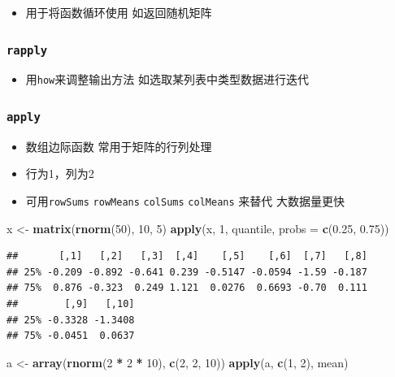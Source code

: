 \documentclass[
]{book}
\newenvironment{Shaded}{\begin{snugshade}}{\end{snugshade}}
\newcommand{\DataTypeTok}[1]{\textcolor[rgb]{0.13,0.29,0.53}{#1}}
\newcommand{\DecValTok}[1]{\textcolor[rgb]{0.00,0.00,0.81}{#1}}
\newcommand{\FloatTok}[1]{\textcolor[rgb]{0.00,0.00,0.81}{#1}}
\newcommand{\KeywordTok}[1]{\textcolor[rgb]{0.13,0.29,0.53}{\textbf{#1}}}
\newcommand{\NormalTok}[1]{#1}
\newcommand{\OperatorTok}[1]{\textcolor[rgb]{0.81,0.36,0.00}{\textbf{#1}}}
\newcommand{\StringTok}[1]{\textcolor[rgb]{0.31,0.60,0.02}{#1}}
\providecommand{\tightlist}{%
  \setlength{\itemsep}{0pt}\setlength{\parskip}{0pt}}
\begin{document}
\begin{itemize}
\tightlist
\item
  用于将函数循环使用 如返回随机矩阵
\end{itemize}

\hypertarget{rapply}{%
\subsubsection{\texorpdfstring{\texttt{rapply}}{rapply}}\label{rapply}}

\begin{itemize}
\tightlist
\item
  用\texttt{how}来调整输出方法 如选取某列表中类型数据进行迭代
\end{itemize}

\hypertarget{apply}{%
\subsubsection{\texorpdfstring{\texttt{apply}}{apply}}\label{apply}}

\begin{itemize}
\tightlist
\item
  数组边际函数 常用于矩阵的行列处理
\item
  行为1，列为2
\item
  可用\texttt{rowSums} \texttt{rowMeans} \texttt{colSums} \texttt{colMeans} 来替代 大数据量更快
\end{itemize}

\begin{Shaded}
\begin{Highlighting}[]
\NormalTok{x <-}\StringTok{ }\KeywordTok{matrix}\NormalTok{(}\KeywordTok{rnorm}\NormalTok{(}\DecValTok{50}\NormalTok{), }\DecValTok{10}\NormalTok{, }\DecValTok{5}\NormalTok{)}
\KeywordTok{apply}\NormalTok{(x, }\DecValTok{1}\NormalTok{, quantile, }\DataTypeTok{probs =} \KeywordTok{c}\NormalTok{(}\FloatTok{0.25}\NormalTok{, }\FloatTok{0.75}\NormalTok{))}
\end{Highlighting}
\end{Shaded}

\begin{verbatim}
##       [,1]   [,2]   [,3]  [,4]    [,5]    [,6]  [,7]   [,8]
## 25% -0.209 -0.892 -0.641 0.239 -0.5147 -0.0594 -1.59 -0.187
## 75%  0.876 -0.323  0.249 1.121  0.0276  0.6693 -0.70  0.111
##        [,9]   [,10]
## 25% -0.3328 -1.3408
## 75% -0.0451  0.0637
\end{verbatim}

\begin{Shaded}
\begin{Highlighting}[]
\NormalTok{a <-}\StringTok{ }\KeywordTok{array}\NormalTok{(}\KeywordTok{rnorm}\NormalTok{(}\DecValTok{2} \OperatorTok{*}\StringTok{ }\DecValTok{2} \OperatorTok{*}\StringTok{ }\DecValTok{10}\NormalTok{), }\KeywordTok{c}\NormalTok{(}\DecValTok{2}\NormalTok{, }\DecValTok{2}\NormalTok{, }\DecValTok{10}\NormalTok{))}
\KeywordTok{apply}\NormalTok{(a, }\KeywordTok{c}\NormalTok{(}\DecValTok{1}\NormalTok{, }\DecValTok{2}\NormalTok{), mean)}
\end{Highlighting}
\end{Shaded}
\end{document}
